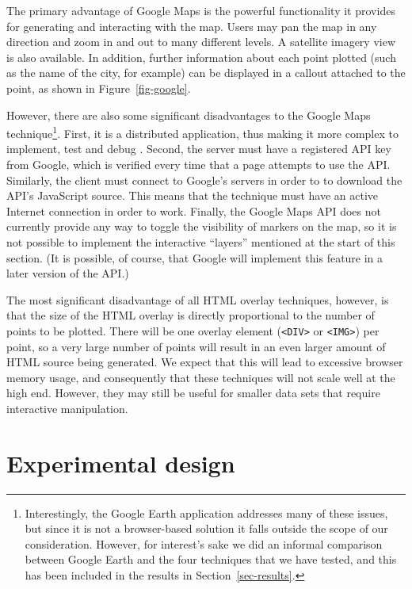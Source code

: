 \documentclass[acmtocl,acmnow]{acmtrans2m}
\begin{document}
The primary advantage of Google Maps is the powerful functionality it
provides for generating and interacting with the map. Users may pan the
map in any direction and zoom in and out to many different levels. A
satellite imagery view is also available. In addition, further
information about each point plotted (such as the name of the city, for
example) can be displayed in a callout attached to the point, as shown
in Figure~\ref{fig-google}.

However, there are also some significant disadvantages to the Google
Maps technique\footnote{Interestingly, the Google Earth application
addresses many of these issues, but since it is not a browser-based
solution it falls outside the scope of our consideration. However, for
interest's sake we did an informal comparison between Google Earth and
the four techniques that we have tested, and this has been included in
the results in Section~\ref{sec-results}.}. First, it is a distributed
application, thus making it more complex to implement, test and debug
\cite{Bates-PC-1995-distdebug,Ensl-PH-1978-distributed}. Second, the
server must have a registered API key from Google, which is verified
every time that a page attempts to use the API. Similarly, the client
must connect to Google's servers in order to to download the API's
JavaScript source. This means that the technique must have an active
Internet connection in order to work. Finally, the Google Maps API does
not currently provide any way to toggle the visibility of markers on the
map, so it is not possible to implement the interactive ``layers''
mentioned at the start of this section. (It is possible, of course, that
Google will implement this feature in a later version of the API.)

The most significant disadvantage of all HTML overlay techniques,
however, is that the size of the HTML overlay is directly proportional
to the number of points to be plotted. There will be one overlay element
(\verb|<DIV>| or \verb|<IMG>|) per point, so a very large number of
points will result in an even larger amount of HTML source being
generated. We expect that this will lead to excessive browser memory
usage, and consequently that these techniques will not scale well at the
high end. However, they may still be useful for smaller data sets that
require interactive manipulation.


\section{Experimental design}
\label{sec-experiment}
\end{document}

